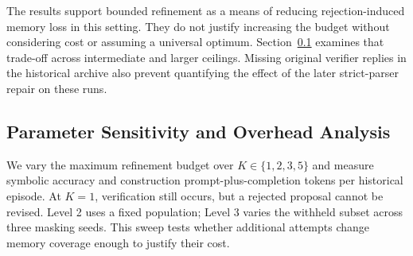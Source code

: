 \documentclass[onecolumn]{IEEEtran}
\numberwithin{equation}{section}
\theoremstyle{definition}
\theoremstyle{remark}
\begin{document}
The results support bounded refinement as a means of reducing rejection-induced memory loss in this setting. They do not justify increasing the budget without considering cost or assuming a universal optimum. Section~\ref{sec:exp4} examines that trade-off across intermediate and larger ceilings. Missing original verifier replies in the historical archive also prevent quantifying the effect of the later strict-parser repair on these runs.

\subsection{Parameter Sensitivity and Overhead Analysis}
\label{sec:exp4}

We vary the maximum refinement budget over $K\in\{1,2,3,5\}$ and measure symbolic accuracy and construction prompt-plus-completion tokens per historical episode. At $K=1$, verification still occurs, but a rejected proposal cannot be revised. Level 2 uses a fixed population; Level 3 varies the withheld subset across three masking seeds. This sweep tests whether additional attempts change memory coverage enough to justify their cost.
\end{document}
